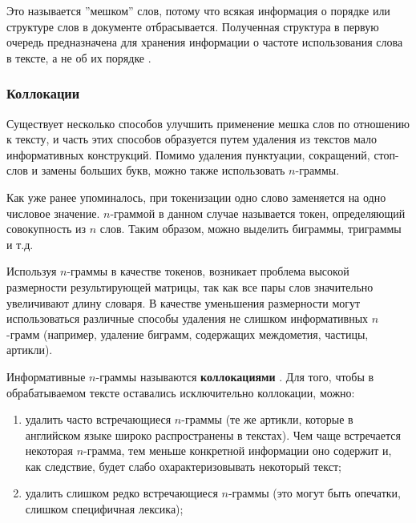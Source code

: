 \documentclass[bachelor, och, coursework]{SCWorks}
\begin{document}
            Это называется ''мешком'' слов, потому что всякая информация о
            порядке или структуре слов в документе отбрасывается. Полученная
            структура в первую очередь предназначена для хранения информации о
            частоте использования слова в тексте, а не об их порядке \cite{bow}.

        \subsubsection{Коллокации}

            Существует несколько способов улучшить применение мешка слов по
            отношению к тексту, и часть этих способов образуется путем удаления
            из текстов мало информативных конструкций. Помимо удаления
            пунктуации, сокращений, стоп-слов и замены больших букв, можно также
            использовать $n$-граммы.
            
            Как уже ранее упоминалось, при токенизации одно слово заменяется на
            одно числовое значение. $n$-граммой в данном случае называется
            токен, определяющий совокупность из $n$ слов. Таким образом, можно
            выделить биграммы, триграммы и т.д.

            Используя $n$-граммы в качестве токенов, возникает проблема высокой
            размерности результирующей матрицы, так как все пары слов
            значительно увеличивают длину словаря. В качестве уменьшения
            размерности могут использоваться различные способы удаления не
            слишком информативных $n$-грамм (например, удаление биграмм,
            содержащих междометия, частицы, артикли).

            Информативные $n$-граммы называются \textbf{коллокациями}
            \cite{coll}. Для того, чтобы в обрабатываемом тексте оставались
            исключительно коллокации, можно:

            \begin{enumerate}
                \item удалить часто встречающиеся $n$-граммы (те же артикли,
                которые в английском языке широко распространены в текстах). Чем
                чаще встречается некоторая $n$-грамма, тем меньше конкретной
                информации оно содержит и, как следствие, будет слабо
                охарактеризовывать некоторый текст;
                \item удалить слишком редко встречающиеся $n$-граммы (это могут
                быть опечатки, слишком специфичная лексика);
            \end{enumerate}
\end{document}
